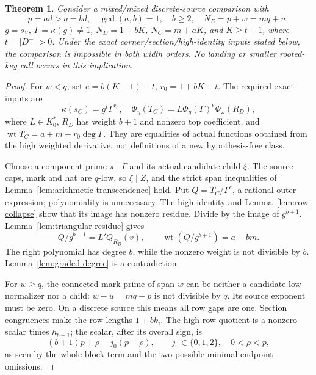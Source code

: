 \documentclass[11pt,a4paper]{amsart}
\numberwithin{equation}{section}
\theoremstyle{plain}
\newtheorem{theorem}{Theorem}[section]
\theoremstyle{definition}
\begin{document}
\begin{theorem}\label{thm:heterogeneous-reduction}
Consider a mixed/mixed discrete-source comparison with
\[
 p=ad>q=bd,\quad\gcd(a,b)=1,\quad b\ge2,\quad
 N_E=p+w=mq+u,
\]
\(g=s_V\), \(\Gamma=\kappa(g)\ne1\), \(N_D=1+bK\), \(N_C=m+aK\), and \(K\ge t+1\), where \(t=|D^-|>0\).  Under the exact corner/section/high-identity inputs stated below, the comparison is impossible in both width orders.  No landing or smaller rooted-key call occurs in this implication.
\end{theorem}
\begin{proof}
For \(w<q\), set \(e=b(K-1)-t\), \(r_0=1+bK-t\).  The required exact inputs are
\[
 \kappa(s_C)=g^t\Gamma^{r_0},\quad
 \Phi_\eta(T_C)=L\Phi_\eta(\Gamma)^e\Phi_\omega(R_D),
\]
where \(L\in K_0^*\), \(R_D\) has weight \(b+1\) and nonzero top coefficient, and
\(\operatorname{wt}T_C=a+m+r_0\deg\Gamma\).
They are equalities of actual functions obtained from the high weighted derivative, not definitions of a new hypothesis-free class.

Choose a component prime \(\pi\mid\Gamma\) and its actual candidate child \(\xi\).  The source caps, mark and hat are \(q\)-low, so \(\xi\mid Z\), and the strict span inequalities of Lemma~\ref{lem:arithmetic-transcendence} hold.  Put \(Q=T_C/\Gamma^e\), a rational outer expression; polynomiality is unnecessary.  The high identity and Lemma~\ref{lem:row-collapse} show that its image has nonzero residue.  Divide by the image of \(g^{b+1}\).  Lemma~\ref{lem:triangular-residue} gives
\[
 \bar Q/\bar g^{b+1}=L'Q_{R_D}(v),\qquad
 \operatorname{wt}(Q/g^{b+1})=a-bm.
\]
The right polynomial has degree \(b\), while the nonzero weight is not divisible by \(b\).  Lemma~\ref{lem:graded-degree} is a contradiction.

For \(w\ge q\), the connected mark prime of span \(w\) can be neither a candidate low normalizer nor a child: \(w-u=mq-p\) is not divisible by \(q\).  Its source exponent must be zero.  On a discrete source this means all row gaps are one.  Section congruences make the row lengths \(1+bk_i\).  The high row quotient is a nonzero scalar times \(h_{b+1}\); the scalar, after its overall sign, is
\[
 (b+1)p+\rho-j_0(p+\rho),\qquad j_0\in\{0,1,2\},\quad0<\rho<p,
\]
as seen by the whole-block term and the two possible minimal endpoint omissions.


\end{proof}
\end{document}
